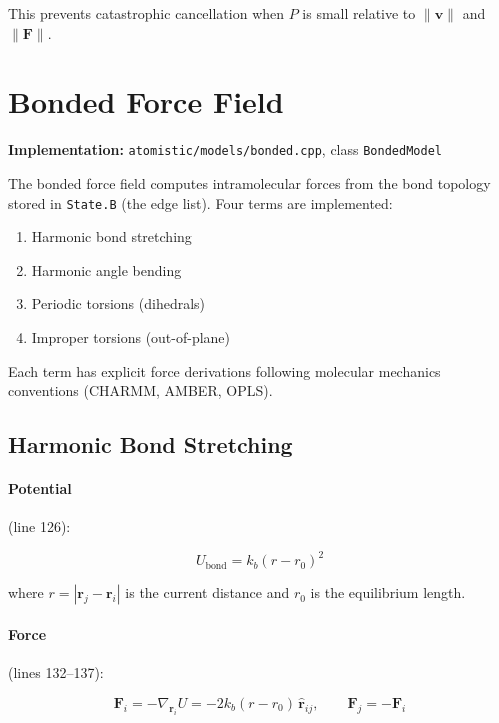 \documentclass[11pt]{article}
\begin{document}
This prevents catastrophic cancellation when $P$ is small relative to $\|\mathbf{v}\|$ and $\|\mathbf{F}\|$.

\section{Bonded Force Field}

\textbf{Implementation:} \texttt{atomistic/models/bonded.cpp}, class \texttt{BondedModel}

The bonded force field computes intramolecular forces from the bond topology stored in \texttt{State.B} (the edge list). Four terms are implemented:

\begin{enumerate}
\item Harmonic bond stretching
\item Harmonic angle bending
\item Periodic torsions (dihedrals)
\item Improper torsions (out-of-plane)
\end{enumerate}

Each term has explicit force derivations following molecular mechanics conventions (CHARMM, AMBER, OPLS).

\subsection{Harmonic Bond Stretching}

\paragraph{Potential} (line 126):

\begin{equation}
U_{\text{bond}} = k_b (r - r_0)^2
\end{equation}

where $r = |\mathbf{r}_j - \mathbf{r}_i|$ is the current distance and $r_0$ is the equilibrium length.

\paragraph{Force} (lines 132--137):

\begin{equation}
\mathbf{F}_i = -\nabla_{\mathbf{r}_i} U = -2k_b(r - r_0)\,\hat{\mathbf{r}}_{ij}, \qquad \mathbf{F}_j = -\mathbf{F}_i
\end{equation}
\end{document}
